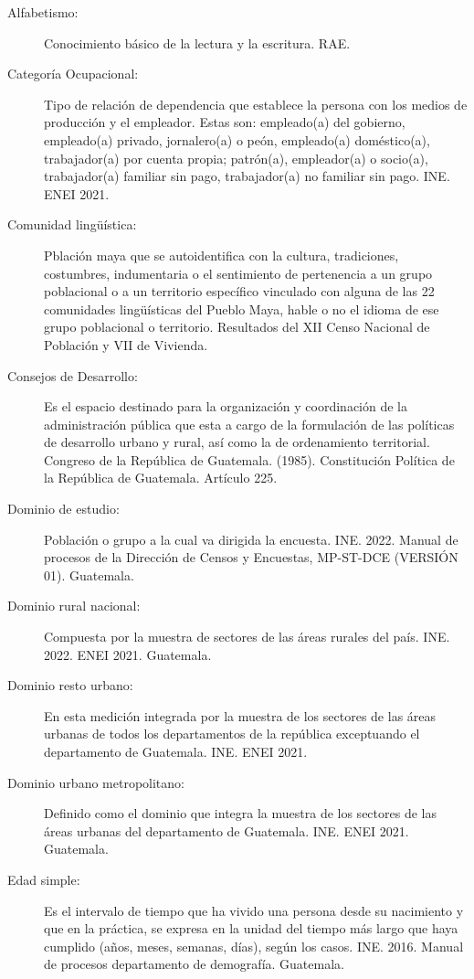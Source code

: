 \begin{description}
	\item[Alfabetismo:] Conocimiento básico de la lectura y la escritura. RAE.
	\item [Categoría Ocupacional:] Tipo de relación de dependencia que establece la persona con los medios de producción y el empleador. Estas son: empleado(a) del gobierno, empleado(a) privado, jornalero(a) o peón, empleado(a) doméstico(a), trabajador(a) por cuenta propia; patrón(a), empleador(a) o socio(a), trabajador(a) familiar sin pago, trabajador(a) no familiar sin pago. INE. ENEI 2021.
	\item[Comunidad lingüística:] Pblación maya que se autoidentifica con la cultura, tradiciones, costumbres, indumentaria o el sentimiento de pertenencia a un grupo poblacional o a un territorio específico vinculado con alguna de las 22 comunidades lingüísticas del Pueblo Maya, hable o no el idioma de ese grupo poblacional o territorio. Resultados del XII Censo Nacional de Población y VII de Vivienda.
	\item[Consejos de Desarrollo:] Es el espacio destinado para la organización y coordinación de la administración pública que esta a cargo de la formulación de las políticas de desarrollo urbano y rural, así como la de ordenamiento territorial. Congreso de la República de Guatemala. (1985). Constitución Política de la República de Guatemala. Artículo 225.
	\item[Dominio de estudio:] Población o grupo a la cual va dirigida la encuesta. INE. 2022. Manual de procesos de la Dirección de Censos y Encuestas, MP-ST-DCE (VERSIÓN 01). Guatemala.
	\item[Dominio rural nacional:] Compuesta por la muestra de sectores de las áreas rurales del país. INE. 2022. ENEI 2021. Guatemala.
	\item[Dominio resto urbano:] En esta medición integrada por la muestra de los sectores de las áreas urbanas de todos los departamentos de la república exceptuando el departamento de Guatemala. INE. ENEI 2021.
	\item[Dominio urbano metropolitano:] Definido como el dominio que integra la muestra de los sectores de las áreas urbanas del departamento de Guatemala. INE. ENEI 2021. Guatemala.
	\item[Edad simple:] Es el intervalo de tiempo que ha vivido una persona desde su nacimiento y que en la práctica, se expresa en la unidad del tiempo más largo que haya cumplido (años, meses, semanas, días), según los casos. INE. 2016. Manual de procesos departamento de demografía. Guatemala.

\end{description}
